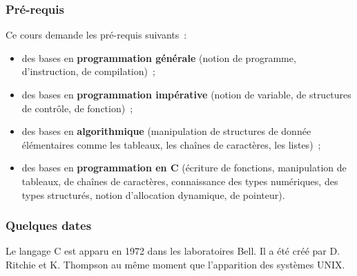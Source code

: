 \begin{frame} \frametitle{Pré-requis}
Ce cours demande les pré-requis suivants~:
\smallskip

\begin{itemize}
    \item des bases en {\bf programmation générale} (notion de programme, 
    d'instruction, de compilation)~;
    \medskip

    \item des bases en {\bf programmation impérative} (notion de variable,
    de structures de contrôle, de fonction)~;
    \medskip
    
    \item des bases en {\bf algorithmique} (manipulation de structures de 
    donnée élémentaires comme les tableaux, les chaînes de caractères,
    les listes)~;
    \medskip
    
    \item des bases en {\bf programmation en {\sf C}} (écriture de 
    fonctions, manipulation de tableaux, de chaînes de caractères, 
    connaissance des types numériques, des types structurés, 
    notion d'allocation dynamique, de pointeur).
\end{itemize}
\end{frame}

\begin{frame} \frametitle{Quelques dates}
Le langage {\sf C} est apparu en 1972 dans les laboratoires Bell.
Il a été créé par \alert{D. Ritchie} et \alert{K. Thompson}
au même moment que l'apparition des systèmes {\sf UNIX}.
\medskip


\end{frame}

